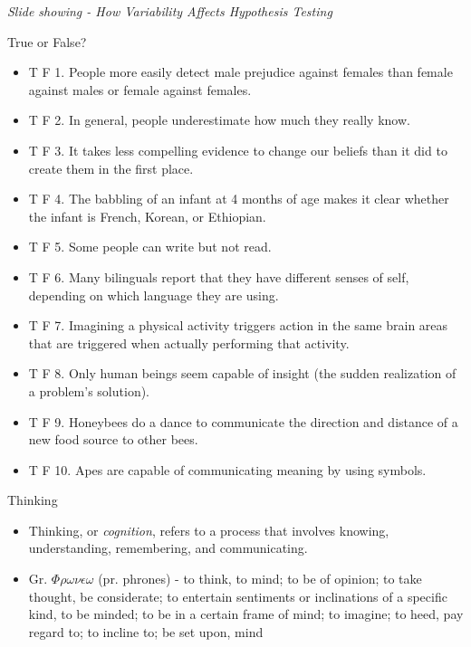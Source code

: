 \documentclass[
]{book}
\providecommand{\tightlist}{%
  \setlength{\itemsep}{0pt}\setlength{\parskip}{0pt}}
\begin{document}
\emph{Slide showing - How Variability Affects Hypothesis Testing}

True or False?

\begin{itemize}
\tightlist
\item
  T F 1. People more easily detect male prejudice against females than female against males or female against females.\\
\item
  T F 2. In general, people underestimate how much they really know.\\
\item
  T F 3. It takes less compelling evidence to change our beliefs than it did to create them in the first place.\\
\item
  T F 4. The babbling of an infant at 4 months of age makes it clear whether the infant is French, Korean, or Ethiopian.\\
\item
  T F 5. Some people can write but not read.\\
\item
  T F 6. Many bilinguals report that they have different senses of self, depending on which language they are using.\\
\item
  T F 7. Imagining a physical activity triggers action in the same brain areas that are triggered when actually performing that activity.\\
\item
  T F 8. Only human beings seem capable of insight (the sudden realization of a problem's solution).\\
\item
  T F 9. Honeybees do a dance to communicate the direction and distance of a new food source to other bees.\\
\item
  T F 10. Apes are capable of communicating meaning by using symbols.
\end{itemize}

Thinking

\begin{itemize}
\tightlist
\item
  Thinking, or \emph{cognition}, refers to a process that involves knowing, understanding, remembering, and communicating.\\
\item
  Gr. \(\Phi\rho\omega\nu\epsilon\omega\) (pr. phrones) - to think, to mind; to be of opinion; to take thought, be considerate; to entertain sentiments or inclinations of a specific kind, to be minded; to be in a certain frame of mind; to imagine; to heed, pay regard to; to incline to; be set upon, mind
\end{itemize}
\end{document}
